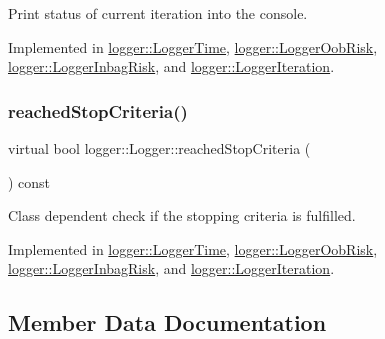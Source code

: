 Print status of current iteration into the console. 



Implemented in \hyperlink{classlogger_1_1_logger_time_a22bef2a992b88689d7748c4017e17d19}{logger\+::\+Logger\+Time}, \hyperlink{classlogger_1_1_logger_oob_risk_a446e3e0c3766c8cda1add83c09d2e968}{logger\+::\+Logger\+Oob\+Risk}, \hyperlink{classlogger_1_1_logger_inbag_risk_a3b7e827e941f2cb4b9def7296a5db38f}{logger\+::\+Logger\+Inbag\+Risk}, and \hyperlink{classlogger_1_1_logger_iteration_ac6283092f495a6e8c5ab357ae84cb911}{logger\+::\+Logger\+Iteration}.

\mbox{\label{classlogger_1_1_logger_aed91421c07062b91cee158ef2bda7ae8}} 
\subsubsection{\texorpdfstring{reached\+Stop\+Criteria()}{reachedStopCriteria()}}
{\footnotesize\ttfamily virtual bool logger\+::\+Logger\+::reached\+Stop\+Criteria (\begin{DoxyParamCaption}{ }\end{DoxyParamCaption}) const\hspace{0.3cm}{\ttfamily [pure virtual]}}



Class dependent check if the stopping criteria is fulfilled. 



Implemented in \hyperlink{classlogger_1_1_logger_time_a727f16a2deed4d64293844615f18df08}{logger\+::\+Logger\+Time}, \hyperlink{classlogger_1_1_logger_oob_risk_a15c6792b0e1d2acbdd907f697f2884f3}{logger\+::\+Logger\+Oob\+Risk}, \hyperlink{classlogger_1_1_logger_inbag_risk_a48453cfb5a3bbe3b1a73bbcb2d40f49e}{logger\+::\+Logger\+Inbag\+Risk}, and \hyperlink{classlogger_1_1_logger_iteration_af4cd1f0b87dcff8a88439f2ca6b07f1f}{logger\+::\+Logger\+Iteration}.



\subsection{Member Data Documentation}
\mbox{\label{classlogger_1_1_logger_a57ca2ab531e0a7ac74f4ecd4b74a938f}} 
